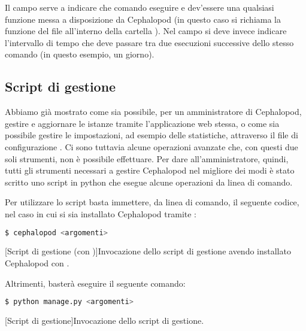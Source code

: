             Il campo  serve a indicare che comando eseguire e dev'essere una qualsiasi funzione messa a disposizione da Cephalopod (in questo caso si richiama la funzione  del file  all'interno della cartella ). Nel campo  si deve invece indicare l'intervallo di tempo che deve passare tra due esecuzioni successive dello stesso comando (in questo esempio, un giorno).
        
        \subsection{Script di gestione} \label{subsec:it;cp;script_gestione}
        
            Abbiamo già mostrato come sia possibile, per un amministratore di Cephalopod, gestire e aggiornare le istanze tramite l'applicazione web stessa, o come sia possibile gestire le impostazioni, ad esempio delle statistiche, attraverso il file di configurazione . Ci sono tuttavia alcune operazioni avanzate che, con questi due soli strumenti, non è possibile effettuare. Per dare all'amministratore, quindi, tutti gli strumenti necessari a gestire Cephalopod nel migliore dei modi è stato scritto uno script in python che esegue alcune operazioni da linea di comando.
            
            Per utilizzare lo script basta immettere, da linea di comando, il seguente codice, nel caso in cui si sia installato Cephalopod tramite :
            
            \begin{center}
                \begin{lstlisting}[language=bash, gobble=18]
                    $ cephalopod <argomenti>
                \end{lstlisting}
                \captionsetup{textformat=empty,labelformat=empty} \vspace{-2em}
                [Script di gestione (con )]{Invocazione dello script di gestione avendo installato Cephalopod con .}
            \end{center}
            
            Altrimenti, basterà eseguire il seguente comando:
            
            \begin{center}
                \begin{lstlisting}[language=bash, gobble=18]
                    $ python manage.py <argomenti>
                \end{lstlisting}
                \captionsetup{textformat=empty,labelformat=empty} \vspace{-2em}
                [Script di gestione]{Invocazione dello script di gestione.}
            \end{center}
            
